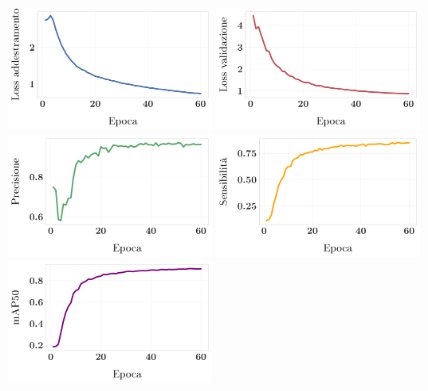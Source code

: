 \documentclass[12pt]{report}
\begin{document}
\begin{figure}[h!]
	\centering
	{\includegraphics[width=0.48\textwidth]{images/domain-shift/real-to-real/1/train-loss}}
	\hspace{0.01\textwidth}
	{\includegraphics[width=0.48\textwidth]{images/domain-shift/real-to-real/1/validation-loss}}
	\hspace{0.01\textwidth}
	\\	
	{\includegraphics[width=0.48\textwidth]{images/domain-shift/real-to-real/1/precision}}
	\hspace{0.01\textwidth}
	{\includegraphics[width=0.48\textwidth]{images/domain-shift/real-to-real/1/recall}}
	\hspace{0.01\textwidth}
	\\
	{\includegraphics[width=0.48\textwidth]{images/domain-shift/real-to-real/1/map50}}

\end{figure}
\end{document}

